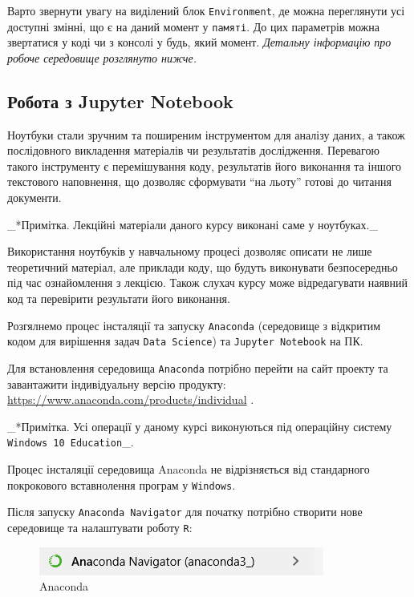 \documentclass[
]{book}
\begin{document}
Варто звернути увагу на виділений блок \texttt{Environment}, де можна переглянути усі доступні змінні, що є на даний момент у \texttt{пам\textquotesingle{}яті}. До цих параметрів можна звертатися у коді чи з консолі у будь, який момент. \emph{Детальну інформацію про робоче середовище розглянуто нижче.}

\hypertarget{chapter133}{%
\subsection{Робота з Jupyter Notebook}\label{chapter133}}

Ноутбуки стали зручним та поширеним інструментом для аналізу даних, а також послідовного викладення матеріалів чи результатів дослідження. Перевагою такого інструменту є перемішування коду, результатів його виконання та іншого текстового наповнення, що дозволяє сформувати ``на льоту'' готові до читання документи.

\_*Примітка. Лекційні матеріали даного курсу виконані саме у ноутбуках.\_

Використання ноутбуків у навчальному процесі дозволяє описати не лише теоретичний матеріал, але приклади коду, що будуть виконувати безпосередньо під час ознайомлення з лекцією. Також слухач курсу може відредагувати наявний код та перевірити результати його виконання.

Розгялнемо процес інсталяції та запуску \texttt{Anaconda} (середовище з відкритим кодом для вирішення задач \texttt{Data\ Science}) та \texttt{Jupyter\ Notebook} на ПК.

Для встановлення середовища \texttt{Anaconda} потрібно перейти на сайт проекту та завантажити індивідуальну версію продукту: \url{https://www.anaconda.com/products/individual} \citep{Anaconda-site}.

\_*Примітка. Усі операції у даному курсі виконуються під операційну систему \texttt{Windows\ 10\ Education}\_.

Процес інсталяції середовища Anaconda не відрізняється від стандарного покрокового вставнолення програм у \texttt{Windows}.

Після запуску \texttt{Anaconda\ Navigator} для початку потрібно створити нове середовище та налаштувати роботу \texttt{R}:

\begin{figure}
\centering
\includegraphics{images/chapter1/anaconda_1.png}
\caption{Anaconda}
\end{figure}
\end{document}
